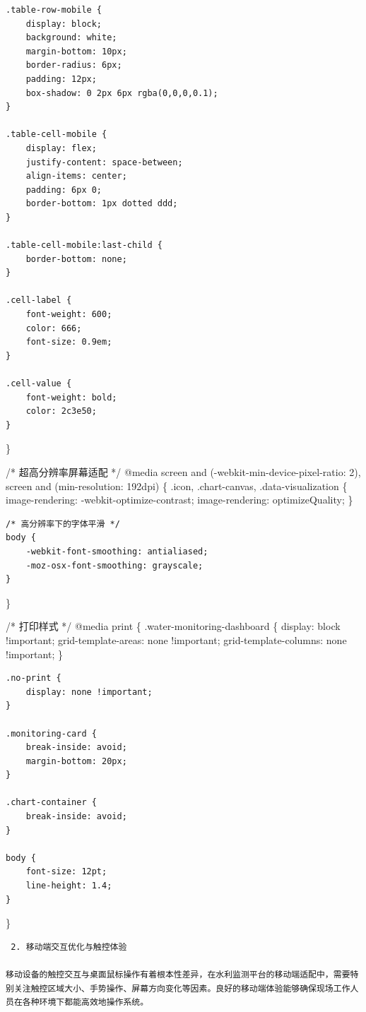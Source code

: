 \begin{verbatim}
.table-row-mobile {
    display: block;
    background: white;
    margin-bottom: 10px;
    border-radius: 6px;
    padding: 12px;
    box-shadow: 0 2px 6px rgba(0,0,0,0.1);
}

.table-cell-mobile {
    display: flex;
    justify-content: space-between;
    align-items: center;
    padding: 6px 0;
    border-bottom: 1px dotted ddd;
}

.table-cell-mobile:last-child {
    border-bottom: none;
}

.cell-label {
    font-weight: 600;
    color: 666;
    font-size: 0.9em;
}

.cell-value {
    font-weight: bold;
    color: 2c3e50;
}
\end{verbatim}

\}

/* 超高分辨率屏幕适配 */ @media screen and (-webkit-min-device-pixel-ratio: 2), screen and (min-resolution: 192dpi) \{ .icon, .chart-canvas, .data-visualization \{ image-rendering: -webkit-optimize-contrast; image-rendering: optimizeQuality; \}

\begin{verbatim}
/* 高分辨率下的字体平滑 */
body {
    -webkit-font-smoothing: antialiased;
    -moz-osx-font-smoothing: grayscale;
}
\end{verbatim}

\}

/* 打印样式 */ @media print \{ .water-monitoring-dashboard \{ display: block !important; grid-template-areas: none !important; grid-template-columns: none !important; \}

\begin{verbatim}
.no-print {
    display: none !important;
}

.monitoring-card {
    break-inside: avoid;
    margin-bottom: 20px;
}

.chart-container {
    break-inside: avoid;
}

body {
    font-size: 12pt;
    line-height: 1.4;
}
\end{verbatim}

\}

\begin{lstlisting}
 2. 移动端交互优化与触控体验

移动设备的触控交互与桌面鼠标操作有着根本性差异，在水利监测平台的移动端适配中，需要特别关注触控区域大小、手势操作、屏幕方向变化等因素。良好的移动端体验能够确保现场工作人员在各种环境下都能高效地操作系统。
\end{lstlisting}

